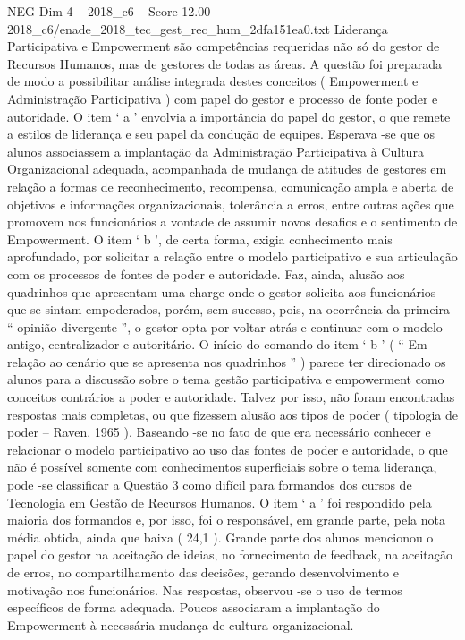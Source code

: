 \begin{textsample}{NEG Dim 4 – 2018\_c6 – Score 12.00 – 2018\_c6/enade\_2018\_tec\_gest\_rec\_hum\_2dfa151ea0.txt}
Liderança Participativa e Empowerment são competências requeridas não só do gestor de Recursos Humanos, mas de gestores de todas as áreas.
A questão foi preparada de modo a possibilitar análise integrada destes conceitos ( Empowerment e Administração Participativa ) com papel do gestor e processo de fonte poder e autoridade.
O item ‘ a ’ envolvia a importância do papel do gestor, o que remete a estilos de liderança e seu papel da condução de equipes.
Esperava -se que os alunos associassem a implantação da Administração Participativa à Cultura Organizacional adequada, acompanhada de mudança de atitudes de gestores em relação a formas de reconhecimento, recompensa, comunicação ampla e aberta de objetivos e informações organizacionais, tolerância a erros, entre outras ações que promovem nos funcionários a vontade de assumir novos desafios e o sentimento de Empowerment.
O item ‘ b ’, de certa forma, exigia conhecimento mais aprofundado, por solicitar a relação entre o modelo participativo e sua articulação com os processos de fontes de poder e autoridade.
Faz, ainda, alusão aos quadrinhos que apresentam uma charge onde o gestor solicita aos funcionários que se sintam empoderados, porém, sem sucesso, pois, na ocorrência da primeira “ opinião divergente ”, o gestor opta por voltar atrás e continuar com o modelo antigo, centralizador e autoritário.
O início do comando do item ‘ b ’ ( “ Em relação ao cenário que se apresenta nos quadrinhos ” ) parece ter direcionado os alunos para a discussão sobre o tema gestão participativa e empowerment como conceitos contrários a poder e autoridade.
Talvez por isso, não foram encontradas respostas mais completas, ou que fizessem alusão aos tipos de poder ( tipologia de poder – Raven, 1965 ).
Baseando -se no fato de que era necessário conhecer e relacionar o modelo participativo ao uso das fontes de poder e autoridade, o que não é possível somente com conhecimentos superficiais sobre o tema liderança, pode -se classificar a Questão 3 como difícil para formandos dos cursos de Tecnologia em Gestão de Recursos Humanos.
O item ‘ a ’ foi respondido pela maioria dos formandos e, por isso, foi o responsável, em grande parte, pela nota média obtida, ainda que baixa ( 24,1 ).
Grande parte dos alunos mencionou o papel do gestor na aceitação de ideias, no fornecimento de feedback, na aceitação de erros, no compartilhamento das decisões, gerando desenvolvimento e motivação nos funcionários.
Nas respostas, observou -se o uso de termos específicos de forma adequada.
Poucos associaram a implantação do Empowerment à necessária mudança de cultura organizacional.

\end{textsample}
